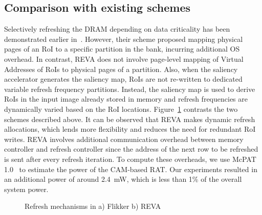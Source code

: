 \subsection{Comparison with existing schemes}
Selectively refreshing the DRAM depending on data criticality has been demonstrated earlier in~\cite{Liu2011}. 
However, their scheme proposed mapping physical pages of an RoI to a specific partition in the bank, incurring additional OS overhead. In contrast, REVA does not involve page-level mapping of Virtual Addresses of RoIs to physical pages of a partition. 
Also, when the saliency accelerator generates the saliency map, RoIs are not re-written to dedicated variable refresh frequency partitions. Instead, the saliency map is used to derive RoIs in the input image already stored in memory and refresh frequencies are dynamically varied based on the RoI locations.
Figure~\ref{fig:reva-refresh} contrasts the two schemes described above. It can be observed that REVA makes dynamic refresh allocations, which lends more flexibility and reduces the need for redundant RoI writes.
REVA involves additional communication overhead between memory controller and refresh controller since the address of the next row to be refreshed is sent after every refresh iteration. 
To compute these overheads, we use McPAT 1.0~\cite{mcpat} to estimate the power of the CAM-based RAT. Our experiments resulted in an additional power of around 2.4~mW, which is less than 1\% of the overall system power.

\begin{figure}[ht!]
\centering
{}
\caption{\label{fig:reva-refresh} Refresh mechanisms in a) Flikker  b) REVA}
\vspace{-0.2in}
\end{figure}
